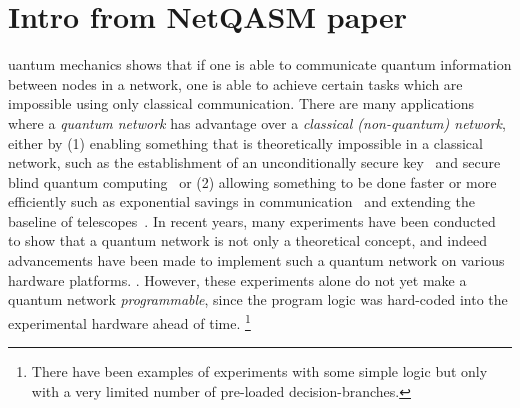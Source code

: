 





\section{Intro from NetQASM paper}

uantum mechanics shows that if one is able to communicate quantum information between nodes in a network, one is able to achieve certain tasks which are impossible using only classical communication.
There are many applications~\cite{Wehner2018stages} where a \emph{quantum network} has advantage over a \emph{classical (non-quantum) network}, either by
    (1) enabling something that is theoretically impossible in a classical network, such as the establishment of an unconditionally secure key~\cite{bb84} and secure blind quantum computing~\cite{childs2005assisted} or
    (2) allowing something to be done faster or more efficiently such as exponential savings in communication~\cite{Buhrman2010} and extending the baseline of telescopes~\cite{gottesman2012longer}.
In recent years, many experiments have been conducted to show that a quantum network is not only a theoretical concept, and indeed advancements have been made to implement such a quantum network on various hardware platforms.
\cite{Hensen2015, Humphreys2018, moehring2007entanglement, hofmann2012heralded, Kalb2017, Inlek2017, sangouard2011quantum}.
However, these experiments alone do not yet make a quantum network \textit{programmable}, since the program logic was hard-coded into the experimental hardware ahead of time.
\footnote{There have been examples of experiments with some simple logic but only with a very limited number of pre-loaded decision-branches.}

